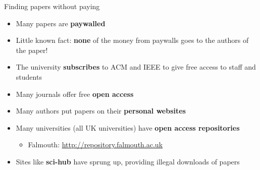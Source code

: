 \begin{frame}{Finding papers without paying}
	\begin{itemize}
		\pause\item Many papers are \textbf{paywalled}
		\pause\item Little known fact: \textbf{none} of the money from paywalls goes to the authors of the paper!
		\pause\item The university \textbf{subscribes} to ACM and IEEE to give free access to staff and students
		\pause\item Many journals offer free \textbf{open access}
		\pause\item Many authors put papers on their \textbf{personal websites}
		\pause\item Many universities (all UK universities) have \textbf{open access repositories}
			\begin{itemize}
				\pause\item Falmouth: \url{http://repository.falmouth.ac.uk}
			\end{itemize}
		\pause\item Sites like \textbf{sci-hub} have sprung up, providing illegal downloads of papers
	\end{itemize}
\end{frame}
